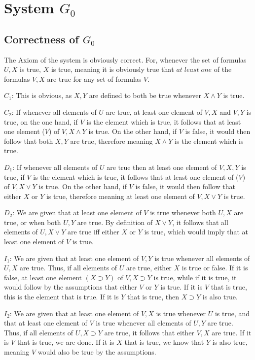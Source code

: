 \documentclass{article}
\theoremstyle{definition}
\begin{document}
\section*{System $G_0$}

\subsection*{Correctness of $G_0$}


The Axiom of the system is obviously correct. For, whenever the set of formulas $U,X$ is true, $X$ is true, meaning it is obviously true that $at\; least\; one$ of the 
formulas $V,X$ are true for any set of formulas $V$.


$C_1$: This is obvious, as $X,Y$ are defined to both be true whenever $X\wedge Y$ is true. 


$C_2$: If whenever all elements of $U$ are true, at least one element of $V,X$ and $V,Y$ is true, on the one hand, if $V$ is the element which is true, it 
follows that at least one element ($V$) of $V,X\wedge Y$ is true. On the other hand, if $V$ is false, it would then follow that both $X,Y$ are true, therefore meaning 
$X\wedge Y$ is the element which is true. 


$D_1$: If whenever all elements of $U$ are true then at least one element of $V,X,Y$ is true, if $V$ is the element which is true, it follows that at least one element 
of ($V$) of $V,X\vee Y$ is true. On the other hand, if $V$ is false, it would then follow that either $X$ or $Y$ is true, therefore meaning at least one element of 
$V,X\vee Y$ is true.


$D_2$: We are given that at least one element of $V$ is true whenever both $U,X$ are true, or when both $U,Y$ are true. By definition of $X\vee Y$, it follows that all 
elements of $U,X\vee Y$ are true iff either $X$ or $Y$ is true, which would imply that at least one element of $V$ is true.


$I_1$: We are given that at least one element of $V,Y$ is true whenever all elements of $U,X$ are true. Thus, if all elements of $U$ are true, either $X$ is true or false. 
If it is false, at least one element $(X\supset Y)$ of $V,X\supset Y$ is true, while if it is true, it would follow by the assumptions that either $V$ or $Y$ is true. If it 
is $V$ that is true, this is the element that is true. If it is $Y$ that is true, then $X\supset Y$ is also true.


$I_2$: We are given that at least one element of $V,X$ is true whenever $U$ is true, and that at least one element of $V$ is true whenever all elements of $U,Y$ are true. 
Thus, if all elements of $U,X\supset Y$ are true, it follows that either $V,X$ are true. If it is $V$ that is true, we are done. If it is $X$ that is true, we know that $Y$ is 
also true, meaning $V$ would also be true by the assumptions.
\end{document}
